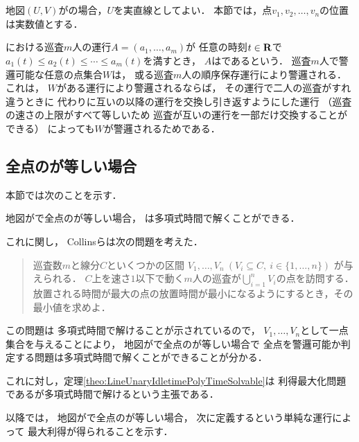 \chapter{{\graphLine}}
\label{chapter: line}

地図$(U, V)$が{\graphLine}の場合，$U$を実直線としてよい．
本節では，点$v_1, v_2, \ldots, v_n$の位置は実数値とする．

{\graphLine}における巡査$m$人の運行$A = (a_1, \ldots, a_m)$が
任意の時刻$t \in \mathbf R$で
$a_1(t) \leq a_2(t) \leq \cdots \leq a_m(t)$を満すとき，
$A$はであるという．
巡査$m$人で警邏可能な任意の点集合$W$は，
或る巡査$m$人の順序保存運行により警邏される．
これは，
$W$がある運行により警邏されるならば，
その運行で二人の巡査がすれ違うときに
代わりに互いの以降の運行を交換し引き返すようにした運行
（巡査の速さの上限がすべて等しいため
巡査が互いの運行を一部だけ交換することができる）
によっても$W$が警邏されるためである．


\section{全点の{\maxIdletime}が等しい場合}
\label{section:LineUnaryIdletimePolyTimeSolvable}


本節では次のことを示す．

\begin{theo}
  \label{theo:LineUnaryIdletimePolyTimeSolvable}
  地図が{\graphLine}で全点の{\maxIdletime}が等しい場合，
  {\patProb}は多項式時間で解くことができる．
\end{theo}

これに関し，
Collinsら\cite{collins2013optimal}は次の問題を考えた．
\begin{quote}
  巡査数$m$と線分$C$といくつかの区間
  $V_1, \ldots, V_n\ (V_i \subseteq C,\ i \in \{1,\ldots, n\})$%
  が与えられる．
  $C$上を速さ$1$以下で動く$m$人の巡査が$\bigcup_{i = 1}^n V_i$の点を訪問する．
  放置される時間が最大の点の放置時間が最小になるようにするとき，その最小値を求めよ．
\end{quote}
この問題は
多項式時間で解けることが示されている\cite[Theorem~2.1]{collins2013optimal}ので，
$V_1, \ldots, V_n$として一点集合を与えることにより，
地図が{\graphLine}で全点の{\maxIdletime}が等しい場合で
全点を警邏可能か判定する問題は多項式時間で解くことができることが分かる．

これに対し，定理\ref{theo:LineUnaryIdletimePolyTimeSolvable}は
利得最大化問題である{\patProb}が多項式時間で解けるという主張である．

以降では，
地図が{\graphLine}で全点の{\maxIdletime}が等しい場合，
次に定義するという単純な運行によって
最大利得が得られることを示す．

